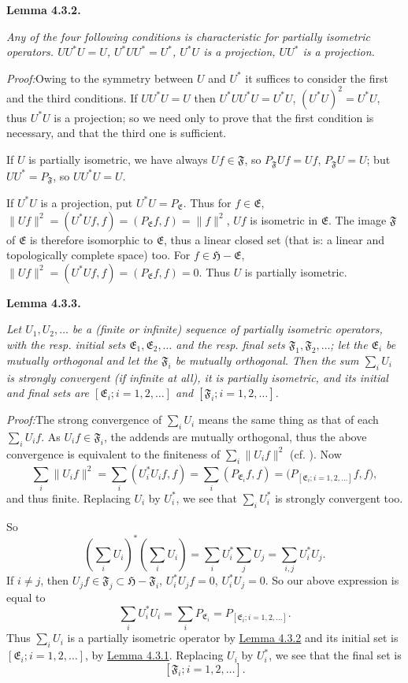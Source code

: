 \documentclass[12pt,b5paper,twoside]{article}
\newcommand{\Hspace}{\mathfrak H}
\newcommand{\Lemma}[1]{%
  \par\smallskip\noindent\phantomsection\label{lem:#1}\textbf{Lemma #1.}\enspace
}
\newcommand{\Proof}{\par\noindent\textit{Proof:}\enspace}
\newcommand{\lemref}[1]{\hyperref[lem:#1]{Lemma #1}}
\begin{document}
\Lemma{4.3.2}
\emph{Any of the four following conditions is characteristic for partially
isometric operators. $UU^*U=U$, $U^*UU^*=U^*$, $U^*U$ is a projection,
$UU^*$ is a projection.}

\Proof Owing to the symmetry between $U$ and $U^*$ it suffices to consider
the first and the third conditions. If $UU^*U=U$ then
$U^*UU^*U=U^*U$, $(U^*U)^2=U^*U$, thus $U^*U$ is a projection; so we need
only to prove that the first condition is necessary, and that the third one is
sufficient.

If $U$ is partially isometric, we have always $Uf\in\mathfrak F$, so
$P_{\mathfrak F}Uf=Uf$, $P_{\mathfrak F}U=U$; but
$UU^*=P_{\mathfrak F}$, so $UU^*U=U$.

If $U^*U$ is a projection, put $U^*U=P_{\mathfrak E}$. Thus for
$f\in\mathfrak E$,
$\lVert Uf\rVert^2=(U^*Uf,f)=(P_{\mathfrak E}f,f)=\lVert f\rVert^2$,
$Uf$ is isometric in $\mathfrak E$. The image $\mathfrak F$ of
$\mathfrak E$ is therefore isomorphic to $\mathfrak E$, thus a linear closed
set (that is: a linear and topologically complete space) too. For
$f\in\Hspace-\mathfrak E$,
$\lVert Uf\rVert^2=(U^*Uf,f)=(P_{\mathfrak E}f,f)=0$. Thus $U$ is partially
isometric.

\Lemma{4.3.3}
\emph{Let $U_1,U_2,\ldots$ be a (finite or infinite) sequence of partially
isometric operators, with the resp. initial sets
$\mathfrak E_1,\mathfrak E_2,\ldots$ and the resp. final sets
$\mathfrak F_1,\mathfrak F_2,\ldots$; let the $\mathfrak E_i$ be mutually
orthogonal and let the $\mathfrak F_i$ be mutually orthogonal. Then the sum
$\sum_iU_i$ is strongly convergent (if infinite at all), it is partially
isometric, and its initial and final sets are
$[\mathfrak E_i;i=1,2,\ldots]$ and $[\mathfrak F_i;i=1,2,\ldots]$.}

\Proof The strong convergence of $\sum_iU_i$ means the same thing as that of
each $\sum_iU_if$. As $U_if\in\mathfrak F_i$, the addends are mutually
orthogonal, thus the above convergence is equivalent to the finiteness of
$\sum_i\lVert U_if\rVert^2$ (cf. \cite[p.~67]{ref16}). Now
\[
 \sum_i\lVert U_if\rVert^2
 =\sum_i(U_i^*U_if,f)
 =\sum_i(P_{\mathfrak E_i}f,f)
 =\bigl(P_{[\mathfrak E_i;i=1,2,\ldots]}f,f\bigr),
\]
and thus finite. Replacing $U_i$ by $U_i^*$, we see that $\sum_iU_i^*$ is
strongly convergent too.

So
\[
 \left(\sum_iU_i\right)^*\left(\sum_iU_i\right)
 =\sum_iU_i^*\sum_jU_j=\sum_{i,j}U_i^*U_j.
\]
If $i\neq j$, then $U_jf\in\mathfrak F_j\subset\Hspace-\mathfrak F_i$,
$U_i^*U_jf=0$, $U_i^*U_j=0$. So our above expression is equal to
\[
 \sum_iU_i^*U_i=\sum_iP_{\mathfrak E_i}
 =P_{[\mathfrak E_i;i=1,2,\ldots]}.
\]
Thus $\sum_iU_i$ is a partially isometric operator by \lemref{4.3.2} and its
initial set is $[\mathfrak E_i;i=1,2,\ldots]$, by \lemref{4.3.1}. Replacing
$U_i$ by $U_i^*$, we see that the final set is
\[
 [\mathfrak F_i;i=1,2,\ldots].
\]
\end{document}
